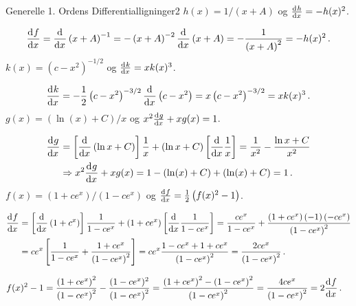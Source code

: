 \begin{opgave}{Generelle 1. Ordens Differentialligninger}{2}
\opg $h(x) = 1/ \left( x+A \right)$ og $\dif{x}{h} = -h(x)^2$.

$$\dif{x}{f} = \dif{x}{}\left( x+A \right)^{-1} = - \left( x+A \right)^{-2} \dif{x}{}\left( x+A \right) = - \frac{1}{\left( x + A \right)^2} = -h(x)^2 \, .$$
\vspace{2mm}
\opg $k(x) = \left( c-x^2 \right)^{-1/2}$ og $\dif{x}{k} = x k(x)^3$.

$$\dif{x}{k} = - \frac{1}{2} \left( c-x^2 \right)^{-3/2}  \dif{x}{}\left( c-x^2 \right) = x \left( c-x^2 \right)^{-3/2} = x k(x)^3 \, .$$
\vspace{2mm}
\opg $g(x) = \left( \ln (x) + C \right)/x$ og $x^2 \dif{x}{g} + x g(x) = 1$.

\begin{align*}
	\dif{x}{g} &= \left[ \dif{x}{}\left( \ln x + C \right) \right] \frac{1}{x} + \left( \ln x + C \right)  \left[ \dif{x}{}\frac{1}{x} \right]  = \frac{1}{x^2} - \frac{\ln x + C}{x^2}  \\ &\Rightarrow x^2 \dif{x}{g} + xg(x) = 1 - \left( \ln (x) + C \right) + \left( \ln (x) + C \right) = 1 \, .
\end{align*}
\vspace{2mm}
\opg $f(x) = \left( 1+ce^x \right)/\left( 1-ce^x \right)$ og $\dif{x}{f} = \frac{1}{2} \left( f(x)^2 -1 \right)$.

\begin{align*}
\dif{x}{f} &= \left[ \dif{x}{}\left( 1+c^x \right) \right] \frac{1}{1-ce^x} + \left( 1+ce^x \right) \left[ \dif{x}{}\frac{1}{1-ce^x} \right] = \frac{ce^x}{1-ce^x} +  \frac{\left( 1+ce^x \right) \left( -1 \right) \left( -ce^x \right)}{\left( 1-ce^x \right)^2} \\
&= ce^x \left[ \frac{1}{1-ce^x} + \frac{1+ce^x}{\left( 1-ce^x \right)^2} \right] = ce^x \frac{1-ce^x + 1+ce^x}{\left( 1-ce^x \right)^2} = \frac{2ce^x}{\left( 1-ce^x \right)^2} \, .
\end{align*}

\begin{align*}
	f(x)^2 - 1  &=  \frac{\left( 1+ce^x \right)^2}{\left( 1-ce^x \right)^2} - \frac{(1-ce^x)^2}{\left( 1-ce^x \right)^2} = \frac{\left( 1+ce^x \right)^2 - \left( 1-ce^x \right)^2}{\left( 1-ce^x \right)^2} = \frac{4ce^x}{\left( 1-ce^x \right)^2} = 2 \dif{x}{f} \, .
\end{align*}
\end{opgave}
